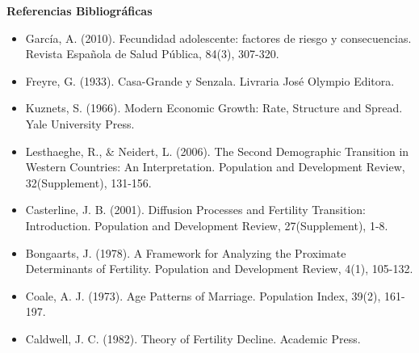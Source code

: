 \documentclass[8pt,a4paper]{beamer}
\begin{document}
{\begin{frame}{\textbf{Referencias Bibliográficas}}

\begin{itemize}
\justifying
\item García, A. (2010). Fecundidad adolescente: factores de riesgo y consecuencias. Revista Española de Salud Pública, 84(3), 307-320.

\item Freyre, G. (1933). Casa-Grande y Senzala. Livraria José Olympio Editora.

\item Kuznets, S. (1966). Modern Economic Growth: Rate, Structure and Spread. Yale University Press.

\item Lesthaeghe, R., \& Neidert, L. (2006). The Second Demographic Transition in Western Countries: An Interpretation. Population and Development Review, 32(Supplement), 131-156.

\item Casterline, J. B. (2001). Diffusion Processes and Fertility Transition: Introduction. Population and Development Review, 27(Supplement), 1-8.

\item Bongaarts, J. (1978). A Framework for Analyzing the Proximate Determinants of Fertility. Population and Development Review, 4(1), 105-132.

\item Coale, A. J. (1973). Age Patterns of Marriage. Population Index, 39(2), 161-197.

\item Caldwell, J. C. (1982). Theory of Fertility Decline. Academic Press.
\end{itemize}

\end{frame}

}
\end{document}
